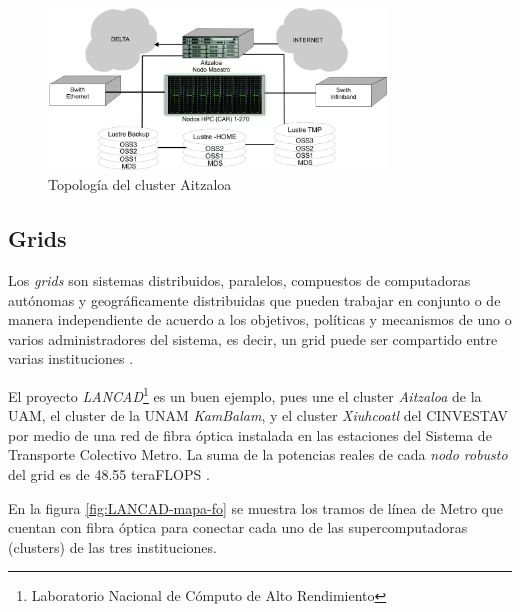 \begin{figure}
    \begin{center}
        \includegraphics[width=0.8\textwidth]{imagenes/topologia_aitzaloa}
    \end{center}
    \caption{Topología del cluster Aitzaloa}
    \label{fig:topologia_aitzaloa}
\end{figure}


\subsection{Grids}
Los \emph{grids} son sistemas distribuidos, paralelos, compuestos de computadoras autónomas y geográficamente distribuidas que pueden trabajar en conjunto o de manera independiente de acuerdo a los objetivos, políticas y mecanismos de uno o varios administradores del sistema, es decir, un grid puede ser compartido entre varias instituciones \cite{buyya2009cloud}. 

El proyecto \emph{LANCAD}\footnote{Laboratorio Nacional de Cómputo de Alto Rendimiento} es un buen ejemplo, pues une el cluster \emph{Aitzaloa} de la UAM, el cluster de la UNAM \emph{KamBalam}, y el cluster \emph{Xiuhcoatl} del CINVESTAV por medio de una red de fibra óptica instalada en las estaciones del Sistema de Transporte Colectivo Metro. La suma de la potencias reales de cada \emph{nodo robusto} del grid es de 48.55 teraFLOPS \cite{lancad2013xiuhcoatl}.

En la figura \ref{fig:LANCAD-mapa-fo} se muestra los tramos de línea de Metro que cuentan con fibra óptica para conectar cada uno de las supercomputadoras (clusters) de las tres instituciones.

